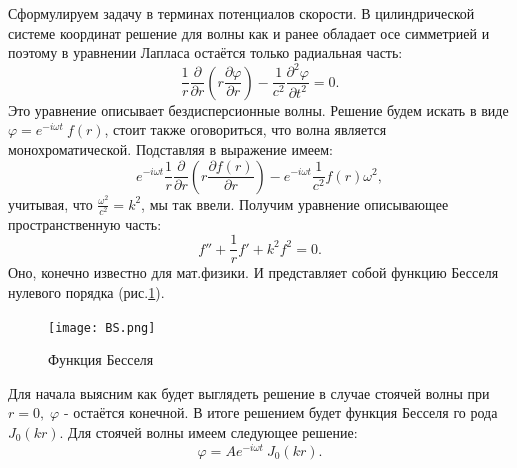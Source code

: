 \documentclass[14pt,a4paper,oneside]{extarticle}	%
\newcommand{\RomanNumeralCaps}[1]{\MakeUppercase{\romannumeral #1}}
\begin{document}
Сформулируем задачу в терминах потенциалов скорости.
В цилиндрической системе координат решение для волны как и ранее обладает осе симметрией и поэтому в уравнении Лапласа остаётся только радиальная часть:  
\begin{equation*}
	\frac{1}{r}\frac{\partial }{\partial r}\left(r\frac{\partial \varphi}{\partial r} \right) - \frac{1}{c^{2}}\frac{\partial^{2} \varphi}{\partial t^{2}} = 0.
\end{equation*}
Это уравнение описывает бездисперсионные волны. Решение будем искать в виде $ \varphi = e^{-i\omega t}\:f(r)  $, стоит также оговориться, что волна является монохроматической. Подставляя в выражение имеем:
\begin{equation*}
e^{-i\omega t}\frac{1}{r}\frac{\partial }{\partial r}\left(r\frac{\partial f(r)}{\partial r} \right) - e^{-i\omega t}\frac{1}{c^{2}}f(r) \omega^{2},
\end{equation*}
 учитывая, что $ \frac{\omega^{2}}{c^{2}} = k^{2} $, мы так ввели.
 Получим уравнение описывающее пространственную часть:
 \begin{equation*}
f''+\frac{1}{r}f'+k^{2}f^{2}=0.
 \end{equation*}
Оно, конечно известно для мат.физики. И представляет собой функцию Бесселя нулевого порядка (рис.\ref{fig::11}).
\begin{figure}[h!] 	%
	\centering 		%
	\texttt{[image: BS.png]} %
	\caption{Функция Бесселя}
	\label{fig::11}
\end{figure}
Для начала выясним как будет выглядеть решение в случае стоячей волны при $ r = 0, \;\varphi  $ - остаётся конечной. В итоге решением будет функция Бесселя \RomanNumeralCaps{1} го рода $ J_{0}(kr) $.
Для стоячей волны имеем следующее решение:
 \begin{equation*}
\varphi = A e^{-i\omega t}\:J_{0}(kr).
\end{equation*}
 
\end{document}
